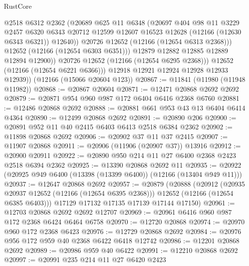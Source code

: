 \begin{lexlean}{RustCore}
\begin{coremodule}
                    @2518
                    @6312
                    @2362
                    (@20689
                      @625
                      @11
                      @6348
                      (@20697
                        @404
                        @98
                        @11
                        @3229
                        @2457
                        @6320
                        @6343
                        @20712
                        @12599
                        @12607
                        @16523
                        @12628
                        (@12166 (@12630 @6343 @6321))
                        @12640))
                    @20726
                    @12652
                    (@12166 (@12654 @6313 @2368)))
                  @12652
                  (@12166 (@12654 @6303 @6351)))
                @12879
                @12882
                @12885
                @12889
                @12894
                @12900))
            @20726
            @12652
            (@12166 (@12654 @6295 @2368)))
          @12652
          (@12166 (@12654 @6221 @6366)))
        @12918
        @12921
        @12924
        @12928
        @12933
        @12939))
    (@12166 (@15066 @20604 @123))
@20867 := @11841 (@11980 (@11948 @11982))
@20868 := @20867 @20604
@20871 := @12471 @20868 @2692 @2692
@20879 := @20871 @954 @960 @987 @172 @6404 @6416 @2368 @6760
@20881 := @12486 @20868 @2692
@20888 := @20881 @661 @953 @43 @13 @6404 @6414 @4364
@20890 := @12499 @20868 @2692
@20891 := @20890 @206
@20900 := @20891 @952 @11 @40 @2415 @6403 @6413 @2518 @6384 @2362
@20902 := @11898 @20868 @2692
@20906 := @20902 @37 @11 @37 @2415
@20907 := @11907 @20868
@20911 := @20906 (@11906 (@20907 @37)) @13916
@20912 := @20900 @20911
@20922 := @20890 @950 @214 @11 @27 @6400 @2368 @2423 @2518 @6394 @2362
@20925 := @13390 @20868 @2692 @11
@20935 := @20922 (@20925 @949 @6400 (@13398 (@13399 @6400)) (@12166 (@13404 @949 @11)))
@20937 := @12647 @20868 @2692
@20957 := @20879
    (@20888
      (@20912
        (@20935 @20937 @12652 (@12166 (@12654 @6395 @2368)))
        @12652
        (@12166 (@12654 @6385 @6403)))
      @17129
      @17132
      @17135
      @17139
      @17144
      @17150)
@20961 := @12703 @20868 @2692 @2692 @12707
@20969 := @20961 @6416 @960 @987 @172 @2368 @6424 @6464 @6758
@20970 := @12720 @20868
@20974 := @20970 @960 @172 @2368 @6423
@20976 := @12729 @20868 @2692
@20984 := @20976 @956 @172 @959 @40 @2368 @6422 @6418 @12742
@20986 := @12201 @20868 @2692
@20989 := @20986 @959 @40 @6422
@20991 := @12210 @20868 @2692
@20997 := @20991 @235 @214 @11 @27 @6420 @2423

\end{coremodule}
\end{lexlean}
